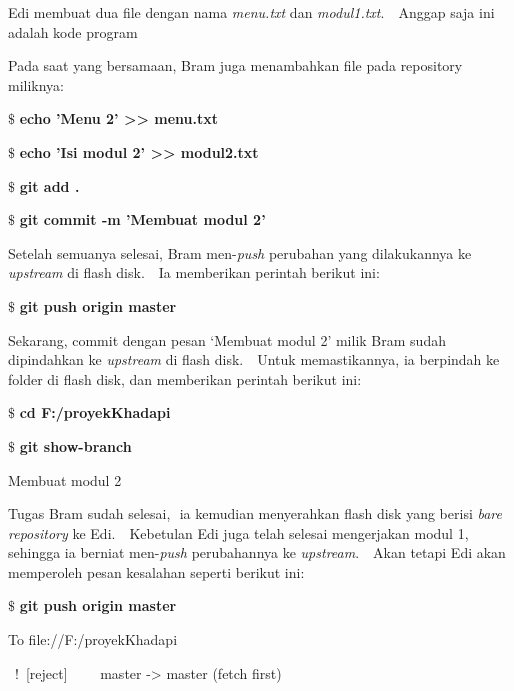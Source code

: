 Edi membuat dua file dengan nama \textit{menu.txt} dan \textit{modul1.txt}. $  $ $  $ Anggap saja ini adalah kode program  \par
\noindent 
Pada saat yang bersamaan, Bram juga menambahkan file pada repository miliknya: \par
\vspace{12pt}
\noindent 
 $  \$  $ \textbf{echo 'Menu 2' >> menu.txt} \par
\noindent 
 $  \$  $ \textbf{echo 'Isi modul 2' >> modul2.txt} \par
\noindent 
 $  \$  $ \textbf{git add .} \par
\noindent 
 $  \$  $ \textbf{git commit -m 'Membuat modul 2'} \par
\noindent 
\vspace{12pt}
\noindent 
Setelah semuanya selesai, Bram men-\textit{push} perubahan yang dilakukannya ke \textit{upstream} di flash disk. $  $ $  $ Ia memberikan perintah berikut ini: \par
\vspace{12pt}
\noindent 
 $  \$  $ \textbf{git push origin master} \par
\noindent 
\vspace{12pt}
\noindent 
Sekarang, commit dengan pesan ‘Membuat modul 2’ milik Bram sudah dipindahkan ke \textit{upstream }di flash disk. $  $ $  $ Untuk memastikannya, ia berpindah ke folder di flash disk, dan memberikan perintah berikut ini: \par
\vspace{12pt}
\noindent 
 $  \$  $ \textbf{cd F:/proyek}\textbf{Khadapi} \par
\noindent 
 $  \$  $ \textbf{git show-branch} \par
\noindent 
[master] Membuat modul 2 \par
\noindent 
\vspace{12pt}
\noindent 
Tugas Bram sudah selesai, $  $ ia kemudian menyerahkan flash disk yang berisi \textit{bare repository} ke Edi. $  $ $  $ Kebetulan Edi juga telah selesai mengerjakan modul 1, sehingga ia berniat men-\textit{push} perubahannya ke \textit{upstream}. $  $ $  $ Akan tetapi Edi akan memperoleh pesan kesalahan seperti berikut ini: \par
\vspace{12pt}
\noindent 
 $  \$  $ \textbf{git push origin master} \par
\noindent 
To file://F:/proyekKhadapi \par
\noindent 
~!~[reject]~~~~   master -> master (fetch first) \par
